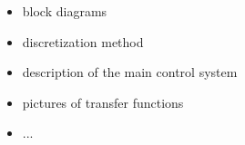 \begin{itemize}
\item block diagrams
\item discretization method 
\item description of the main control system
\item pictures of transfer functions
\item ...
\end{itemize}